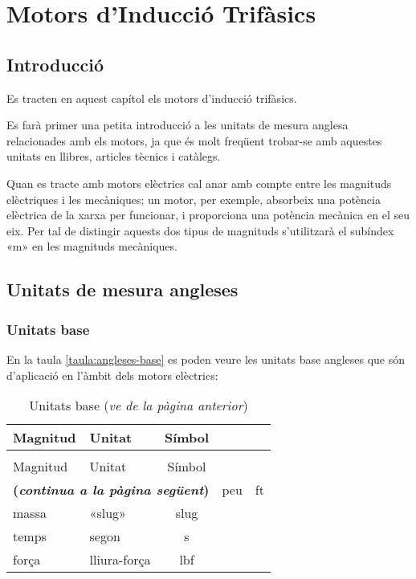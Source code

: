 \chapter{Motors d'Inducció Trifàsics}\label{sec:motors-ind}

\section{Introducció}

Es tracten en aquest capítol els motors d'inducció trifàsics.

Es farà primer una petita introducció a les unitats de mesura anglesa relacionades amb els motors, ja que és molt freqüent trobar-se amb aquestes unitats en llibres, articles tècnics i catàlegs.

Quan es tracte amb motors elèctrics cal anar amb compte entre les magnituds elèctriques i les mecàniques; un motor, per exemple, absorbeix una potència elèctrica de la xarxa per funcionar, i proporciona una potència mecànica en el seu eix. Per tal de distingir aquests dos tipus de magnituds s'utilitzarà el subíndex «m» en les magnituds mecàniques.

\section{Unitats de mesura angleses}

\subsection{Unitats base}

En la taula \vref{taula:angleses-base} es poden veure les unitats base angleses que són d'aplicació en l'àmbit dels motors elèctrics:
\begin{longtable}[h]{llc}
   \caption{\label{taula:angleses-base}Unitats angleses base}\\
   \toprule[1pt]
    Magnitud & Unitat & Símbol \\
   \midrule
   \endfirsthead
   \caption[]{Unitats base (\emph{ve de la pàgina anterior})}\\
   \toprule[1pt]
    Magnitud & Unitat & Símbol \\
   \midrule
   \endhead
   \midrule
   \multicolumn{3}{r}{\sffamily\bfseries\color{NavyBlue}(\emph{continua a la pàgina següent})}
   \endfoot
   \endlastfoot
   longitud & peu & ft \\
   massa & «slug» & slug \\
   temps & segon & s\\
   força & lliura-força & lbf \\
   \bottomrule[1pt]
\end{longtable}

